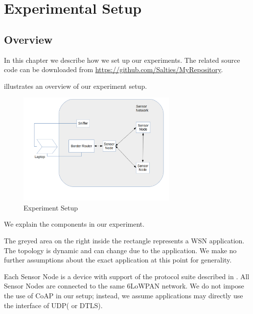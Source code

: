 \chapter{Experimental Setup} \label{Chp: Setup}

\section{Overview}
In this chapter we describe how we set up our experiments. The related source code can be downloaded from \url{https://github.com/Salties/MyRepository}. 

 illustrates an overview of our experiment setup.

\begin{figure}[h!]
	\center
	\includegraphics[width=0.7\textwidth,]{fig/setup.png}
	\caption{Experiment Setup} \label{Fig: Setup}
\end{figure}

We explain the components in our experiment.

\begin{description}[style=nextline]
\item[Sensor Network]
The greyed area on the right inside the rectangle represents a WSN application.  The topology is dynamic and can change due to the application.  We make no further assumptions about the exact application at this point for generality.

\item[Sensor Node]
Each Sensor Node is a device with support of the protocol suite described in . All Sensor Nodes are connected to the same 6LoWPAN network. We do not impose the use of CoAP in our setup; instead, we assume applications may directly use the interface of UDP( or DTLS).

\item[Border Router]

\item[Sniffer]

\item[Laptop]

\end{description}

